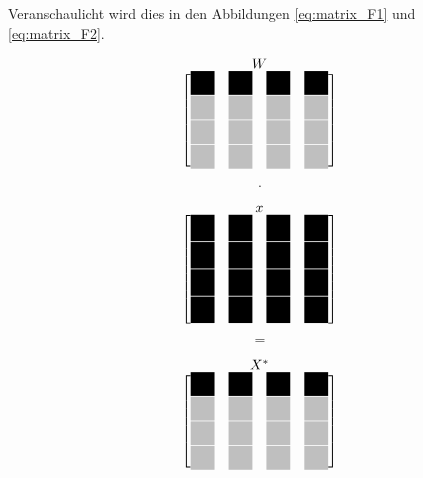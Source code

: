 Veranschaulicht wird dies in den Abbildungen \ref{eq:matrix_F1} und \ref{eq:matrix_F2}.


\begin{center}
 
\begin{minipage}{0.2\textwidth}
 \begingroup
 \renewcommand*{\arraystretch}{1.1} %
 \renewcommand*{\arraycolsep}{0.0pt} %

 \[
  \stackrel{\mbox{$W$}}{
   \begin{bmatrix}
    \myBlackBox 	& \myBlackBox 		& \myBlackBox 		& \myBlackBox \\
    \myLightgrayBox 	& \myLightgrayBox 	& \myLightgrayBox 	& \myLightgrayBox \\
    \myLightgrayBox 	& \myLightgrayBox	& \myLightgrayBox	& \myLightgrayBox \\
    \myLightgrayBox 	& \myLightgrayBox 	& \myLightgrayBox 	& \myLightgrayBox 
   \end{bmatrix}
  }
 \]
 \endgroup
\end{minipage}
\begin{minipage}{0.05\textwidth}
 \[
  \cdot
 \]
\end{minipage}
\begin{minipage}{0.2\textwidth}
 \begingroup
 \renewcommand*{\arraystretch}{0.0} %
 \renewcommand*{\arraycolsep}{0.8pt} %

 \[
  \stackrel{\mbox{$x$}}{
   \begin{bmatrix}
    \myBlackBoxHigh 	& \myBlackBoxHigh 	& \myBlackBoxHigh 	& \myBlackBoxHigh \\
    \myBlackBoxHigh 	& \myBlackBoxHigh 	& \myBlackBoxHigh 	& \myBlackBoxHigh \\
    \myBlackBoxHigh 	& \myBlackBoxHigh 	& \myBlackBoxHigh 	& \myBlackBoxHigh \\
    \myBlackBoxHigh 	& \myBlackBoxHigh 	& \myBlackBoxHigh 	& \myBlackBoxHigh 
   \end{bmatrix}
  }
 \]
 \endgroup
\end{minipage}
\begin{minipage}{0.05\textwidth}
 \[
  =
 \]
\end{minipage}
\begin{minipage}{0.3\textwidth}
\begingroup
\renewcommand*{\arraystretch}{1.1} %
\renewcommand*{\arraycolsep}{0.8pt} %
\begin{align}\label{eq:matrix_F1}
  \stackrel{\mbox{$X^*$}}{
   \begin{bmatrix}
    \myBlackBox 	& \myBlackBox 		& \myBlackBox 		& \myBlackBox \\
    \myLightgrayBox 	& \myLightgrayBox 	& \myLightgrayBox 	& \myLightgrayBox \\
    \myLightgrayBox 	& \myLightgrayBox 	& \myLightgrayBox 	& \myLightgrayBox \\
    \myLightgrayBox 	& \myLightgrayBox 	& \myLightgrayBox 	& \myLightgrayBox 
   \end{bmatrix}
  }
\end{align}

 
 \endgroup
\end{minipage}
\end{center}


